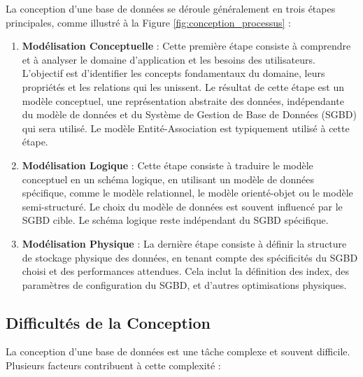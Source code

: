\documentclass{article}
\begin{document}
La conception d'une base de données se déroule généralement en trois étapes principales, comme illustré à la Figure \ref{fig:conception_processus} :

\begin{enumerate}
    \item \textbf{Modélisation Conceptuelle} : Cette première étape consiste à comprendre et à analyser le domaine d'application et les besoins des utilisateurs. L'objectif est d'identifier les concepts fondamentaux du domaine, leurs propriétés et les relations qui les unissent.  Le résultat de cette étape est un modèle conceptuel, une représentation abstraite des données, indépendante du modèle de données et du Système de Gestion de Base de Données (SGBD) qui sera utilisé. Le modèle Entité-Association est typiquement utilisé à cette étape.
    \item \textbf{Modélisation Logique} :  Cette étape consiste à traduire le modèle conceptuel en un schéma logique, en utilisant un modèle de données spécifique, comme le modèle relationnel, le modèle orienté-objet ou le modèle semi-structuré.  Le choix du modèle de données est souvent influencé par le SGBD cible. Le schéma logique reste indépendant du SGBD spécifique.
    \item \textbf{Modélisation Physique} :  La dernière étape consiste à définir la structure de stockage physique des données, en tenant compte des spécificités du SGBD choisi et des performances attendues.  Cela inclut la définition des index, des paramètres de configuration du SGBD, et d'autres optimisations physiques.
\end{enumerate}

\subsection{Difficultés de la Conception}

La conception d'une base de données est une tâche complexe et souvent difficile.  Plusieurs facteurs contribuent à cette complexité :
\end{document}

